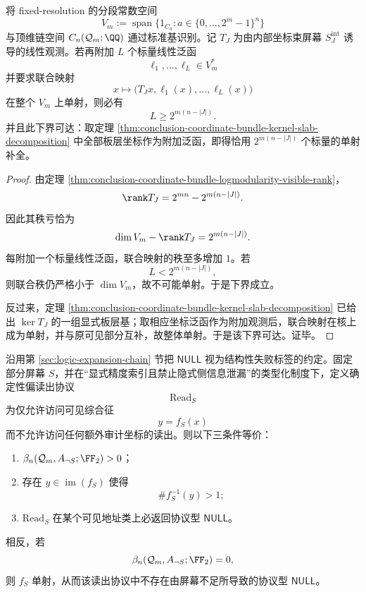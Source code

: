 \begin{theorem}[相对线性全息的精确补充维数]\label{thm:conclusion-relative-linear-holography-exact-supplement-dimension}
将 fixed-resolution 的分段常数空间
\[
V_m:=\operatorname{span}\{1_{C_a}:a\in \{0,\dots,2^m-1\}^n\}
\]
与顶维链空间 \(C_n(\mathcal Q_m;\QQ)\) 通过标准基识别。记 \(T_J\) 为由内部坐标束屏幕 \(S_J^{\mathrm{int}}\) 诱导的线性观测。若再附加 \(L\) 个标量线性泛函
\[
\ell_1,\dots,\ell_L\in V_m^\ast
\]
并要求联合映射
\[
x\longmapsto \bigl(T_Jx,\ell_1(x),\dots,\ell_L(x)\bigr)
\]
在整个 \(V_m\) 上单射，则必有
\[
L\ge 2^{m(n-|J|)}.
\]
并且此下界可达：取定理 \ref{thm:conclusion-coordinate-bundle-kernel-slab-decomposition} 中全部板层坐标作为附加泛函，即得恰用 \(2^{m(n-|J|)}\) 个标量的单射补全。
\end{theorem}

\begin{proof}
由定理 \ref{thm:conclusion-coordinate-bundle-logmodularity-visible-rank}，
\[
\rank T_J=2^{mn}-2^{m(n-|J|)}.
\]
因此其秩亏恰为
\[
\dim V_m-\rank T_J=2^{m(n-|J|)}.
\]
每附加一个标量线性泛函，联合映射的秩至多增加 \(1\)。若
\[
L<2^{m(n-|J|)},
\]
则联合秩仍严格小于 \(\dim V_m\)，故不可能单射。于是下界成立。

反过来，定理 \ref{thm:conclusion-coordinate-bundle-kernel-slab-decomposition} 已给出 \(\ker T_J\) 的一组显式板层基；取相应坐标泛函作为附加观测后，联合映射在核上成为单射，并与原可见部分互补，故整体单射。于是该下界可达。证毕。
\end{proof}

\begin{theorem}\label{thm:conclusion-relative-homology-corank-protocol-null}
沿用第 \ref{sec:logic-expansion-chain} 节把 \(\mathsf{NULL}\) 视为结构性失败标签的约定。固定部分屏幕 \(S\)，并在“显式精度索引且禁止隐式侧信息泄漏”的类型化制度下，定义确定性偏读出协议
\[
\mathrm{Read}_S
\]
为仅允许访问可见综合征
\[
y=f_S(x)
\]
而不允许访问任何额外审计坐标的读出。则以下三条件等价：
\begin{enumerate}
  \item \(\beta_n(\mathcal Q_m,A_{\neg S};\FF_2)>0\)；
  \item 存在 \(y\in \operatorname{im}(f_S)\) 使得
        \[
        \#f_S^{-1}(y)>1;
        \]
  \item \(\mathrm{Read}_S\) 在某个可见地址类上必返回协议型 \(\mathsf{NULL}\)。
\end{enumerate}
相反，若
\[
\beta_n(\mathcal Q_m,A_{\neg S};\FF_2)=0,
\]
则 \(f_S\) 单射，从而该读出协议中不存在由屏幕不足所导致的协议型 \(\mathsf{NULL}\)。
\end{theorem}

